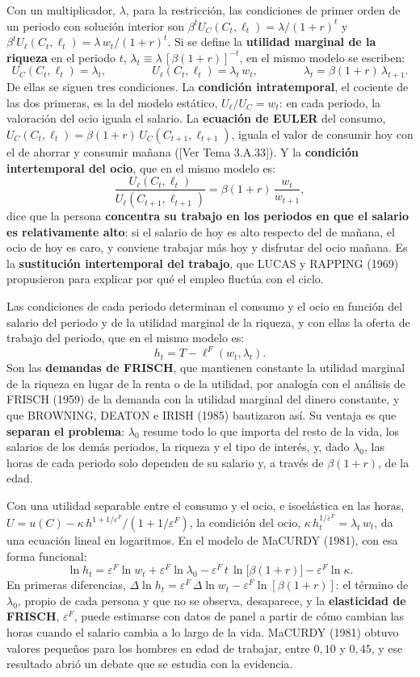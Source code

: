 \documentclass[10pt,a4paper]{article}
\newcommand{\authorfont}[1]{{\fontfamily{EBGaramond-TLF}\selectfont #1}}
\begin{document}
Con un multiplicador, $\lambda$, para la restricción, las condiciones de primer orden de un periodo con solución interior son $\beta^t U_C(C_t,\ell_t)=\lambda/(1+r)^t$ y $\beta^t U_\ell(C_t,\ell_t)=\lambda\,w_t/(1+r)^t$. Si se define la \textbf{utilidad marginal de la riqueza} en el periodo $t$, $\lambda_t\equiv\lambda\,[\beta(1+r)]^{-t}$, en el mismo modelo se escriben:
$$U_C(C_t,\ell_t)=\lambda_t,\qquad\qquad U_\ell(C_t,\ell_t)=\lambda_t\,w_t,\qquad\qquad \lambda_t=\beta(1+r)\,\lambda_{t+1}.$$
De ellas se siguen tres condiciones. La \textbf{condición intratemporal}, el cociente de las dos primeras, es la del modelo estático, $U_\ell/U_C=w_t$: en cada periodo, la valoración del ocio iguala el salario. La \textbf{ecuación de EULER} del consumo, $U_C(C_t,\ell_t)=\beta(1+r)\,U_C(C_{t+1},\ell_{t+1})$, iguala el valor de consumir hoy con el de ahorrar y consumir mañana ([\authorfont{Ver Tema 3.A.33}]). Y la \textbf{condición intertemporal del ocio}, que en el mismo modelo es:
$$\frac{U_\ell(C_t,\ell_t)}{U_\ell(C_{t+1},\ell_{t+1})}=\beta(1+r)\,\frac{w_t}{w_{t+1}},$$
dice que la persona \textbf{concentra su trabajo en los periodos en que el salario es relativamente alto}: si el salario de hoy es alto respecto del de mañana, el ocio de hoy es caro, y conviene trabajar más hoy y disfrutar del ocio mañana. Es la \textbf{sustitución intertemporal del trabajo}, que LUCAS y RAPPING (1969) propusieron para explicar por qué el empleo fluctúa con el ciclo.

Las condiciones de cada periodo determinan el consumo y el ocio en función del salario del periodo y de la utilidad marginal de la riqueza, y con ellas la oferta de trabajo del periodo, que en el mismo modelo es:
$$h_t=T-\ell^F(w_t,\lambda_t).$$
Son las \textbf{demandas de FRISCH}, que mantienen constante la utilidad marginal de la riqueza en lugar de la renta o de la utilidad, por analogía con el análisis de FRISCH (1959) de la demanda con la utilidad marginal del dinero constante, y que BROWNING, DEATON e IRISH (1985) bautizaron así. Su ventaja es que \textbf{separan el problema}: $\lambda_0$ resume todo lo que importa del resto de la vida, los salarios de los demás periodos, la riqueza y el tipo de interés, y, dado $\lambda_0$, las horas de cada periodo solo dependen de su salario y, a través de $\beta(1+r)$, de la edad.

Con una utilidad separable entre el consumo y el ocio, e isoelástica en las horas, $U=u(C)-\kappa\,h^{1+1/\varepsilon^F}/(1+1/\varepsilon^F)$, la condición del ocio, $\kappa\,h_t^{1/\varepsilon^F}=\lambda_t\,w_t$, da una ecuación lineal en logaritmos. En el modelo de MaCURDY (1981), con esa forma funcional:
$$\ln h_t=\varepsilon^F\ln w_t+\varepsilon^F\ln\lambda_0-\varepsilon^F\,t\,\ln\big[\beta(1+r)\big]-\varepsilon^F\ln\kappa.$$
En primeras diferencias, $\Delta\ln h_t=\varepsilon^F\,\Delta\ln w_t-\varepsilon^F\ln[\beta(1+r)]$: el término de $\lambda_0$, propio de cada persona y que no se observa, desaparece, y la \textbf{elasticidad de FRISCH}, $\varepsilon^F$, puede estimarse con datos de panel a partir de cómo cambian las horas cuando el salario cambia a lo largo de la vida. MaCURDY (1981) obtuvo valores pequeños para los hombres en edad de trabajar, entre $0{,}10$ y $0{,}45$, y ese resultado abrió un debate que se estudia con la evidencia.
\end{document}

